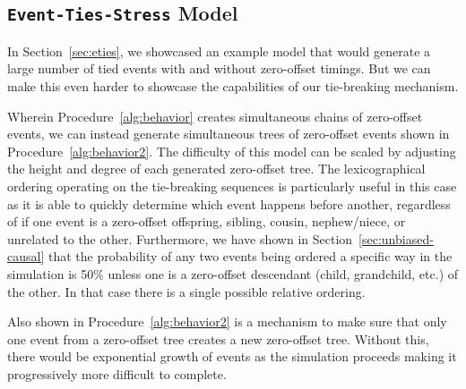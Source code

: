 \documentclass[nonacm,sigconf]{acmart}
\begin{document}


\subsection{\texttt{Event-Ties-Stress} Model}
In Section~\ref{sec:eties}, we showcased an example model that would generate a large number of tied events with and without zero-offset timings. But we can make this even harder to showcase the capabilities of our tie-breaking mechanism.

Wherein Procedure~\ref{alg:behavior} creates simultaneous chains of zero-offset events, we can instead generate simultaneous trees of zero-offset events shown in Procedure~\ref{alg:behavior2}. The difficulty of this model can be scaled by adjusting the height and degree of each generated zero-offset tree. The lexicographical ordering operating on the tie-breaking sequences is particularly useful in this case as it is able to quickly determine which event happens before another, regardless of if one event is a zero-offset offspring, sibling, cousin, nephew/niece, or unrelated to the other. Furthermore, we have shown in Section~\ref{sec:unbiased-causal} that the probability of any two events being ordered a specific way in the simulation is 50\% unless one is a zero-offset descendant (child, grandchild, etc.) of the other. In that case there is a single possible relative ordering.

Also shown in Procedure~\ref{alg:behavior2} is a mechanism to make sure that only one event from a zero-offset tree creates a new zero-offset tree. Without this, there would be exponential growth of events as the simulation proceeds making it progressively more difficult to complete.
\end{document}
